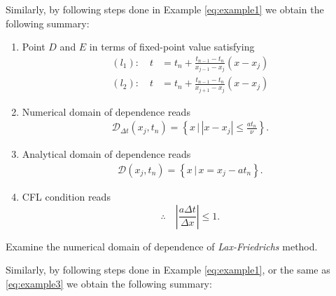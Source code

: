 \documentclass[12pt]{article}
\begin{document}
Similarly, by following steps done in Example \ref{eq:example1} we obtain the following summary:

\begin{enumerate}
	\item Point $D$ and $E$ in terms of fixed-point value satisfying
	      \begin{align}
		      (l_1):\quad t & = t_n + \frac{t_{n-1}-t_n}{x_{j-1}-x_j}\left(x-x_{j}\right) \\
		      (l_2):\quad t & = t_n + \frac{t_{n-1}-t_n}{x_{j+1}-x_j}\left(x-x_{j}\right)
	      \end{align}
	\item Numerical domain of dependence reads
	      \begin{align}
		      \mathcal{D}_{\Delta t}\left(x_j,t_n\right)
		      =  \left\{ x \, \Big|\, \left| x - x_j \right| \leq \frac{at_n}{\nu} \right\}.
	      \end{align}
	      
	\item Analytical domain of dependence reads
	      \begin{align}
		      \mathcal{D}\left(x_j,t_n\right)
		      =  \left\{ x \, \Big|\, x = x_{j} - at_n \right\} .
	      \end{align}
	      
	\item CFL condition reads
	      \begin{equation}
		      \therefore\quad
		      \boxed{
			      \left| \frac{a \Delta t}{\Delta x} \right| \leq 1.
		      }
	      \end{equation}
\end{enumerate}

\pagebreak
\begin{example}
	Examine the numerical domain of dependence of \emph{Lax-Friedrichs} method.
\end{example}

Similarly, by following steps done in Example \ref{eq:example1},
or the same as \ref{eq:example3}
we obtain the following summary:
\end{document}
